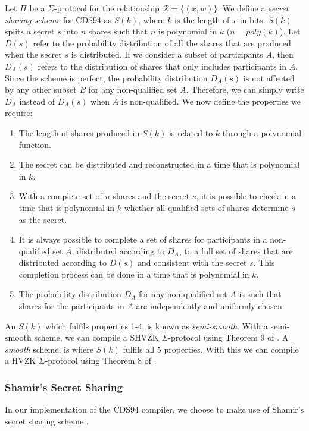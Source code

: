 \begin{definition}\label{def:secret-sharing}
Let $\Pi$ be a $\Sigma$-protocol for the relationship $\mathcal R = \{(x,w)\}$. We define a \textit{secret sharing scheme} for CDS94 as $S(k)$, where $k$ is the length of $x$ in bits. $S(k)$ splits a secret $s$ into $n$ shares such that $n$ is polynomial in $k$ ($n = poly(k)$). Let $D(s)$ refer to the probability distribution of all the shares that are produced when the secret $s$ is distributed. If we consider a subset of participants $A$, then $D_A(s)$ refers to the distribution of shares that only includes participants in $A$. Since the scheme is perfect, the probability distribution $D_A(s)$ is not affected by any other subset $B$ for any non-qualified set $A$. Therefore, we can simply write $D_A$ instead of $D_A(s)$ when $A$ is non-qualified. We now define the properties we require:
    \begin{enumerate}
        \item The length of shares produced in $S(k)$ is related to $k$ through a polynomial function.
        \item The secret can be distributed and reconstructed in a time that is polynomial in $k$.
        \item With a complete set of $n$ shares and the secret $s$, it is possible to check in a time that is polynomial in $k$ whether all qualified sets of shares determine $s$ as the secret.
        \item It is always possible to complete a set of shares for participants in a non-qualified set $A$, distributed according to $D_A$, to a full set of shares that are distributed according to $D(s)$ and consistent with the secret $s$. This completion process can be done in a time that is polynomial in $k$.
        \item The probability distribution $D_A$ for any non-qualified set $A$ is such that shares for the participants in $A$ are independently and uniformly chosen.
    \end{enumerate}
\end{definition}

An $S(k)$ which fulfils properties 1-4, is known as \textit{semi-smooth}. With a semi-smooth scheme, 
we can compile a SHVZK $\Sigma$-protocol using Theorem 9 of \cite{CDS94}. A \textit{smooth} scheme, is where $S(k)$ 
fulfils all 5 properties. With this we can compile a HVZK $\Sigma$-protocol using Theorem 8 of \cite{CDS94}.

\subsubsection{Shamir's Secret Sharing}\label{sec:sss}
In our implementation of the CDS94 compiler, we choose to make use of Shamir's secret sharing scheme \cite{DBLP:journals/cacm/Shamir79}. 

